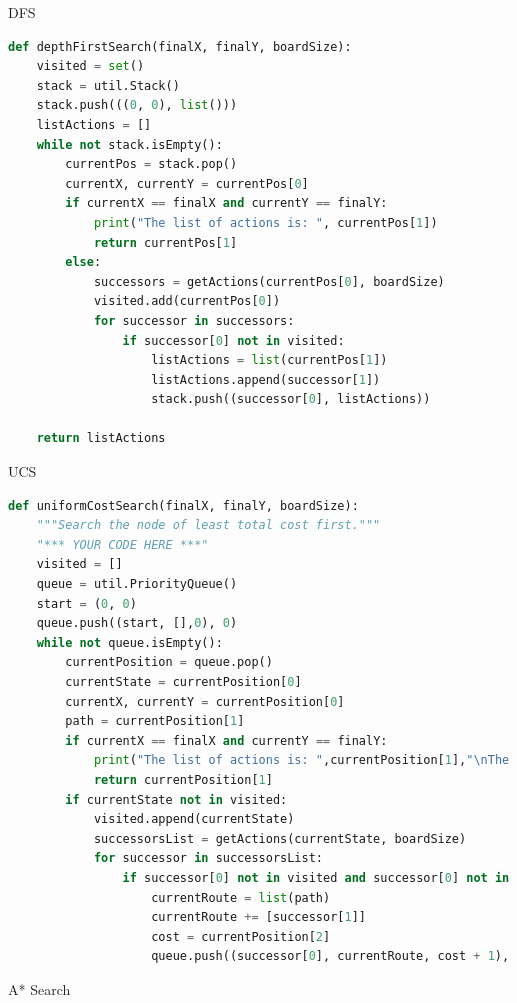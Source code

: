 \documentclass[a4paper,12pt]{report}
\begin{document}
   DFS\\
\begin{lstlisting}[language=Python]
def depthFirstSearch(finalX, finalY, boardSize):
    visited = set()
    stack = util.Stack()
    stack.push(((0, 0), list()))
    listActions = []
    while not stack.isEmpty():
        currentPos = stack.pop()
        currentX, currentY = currentPos[0]
        if currentX == finalX and currentY == finalY:
            print("The list of actions is: ", currentPos[1])
            return currentPos[1]
        else:
            successors = getActions(currentPos[0], boardSize)
            visited.add(currentPos[0])
            for successor in successors:
                if successor[0] not in visited:
                    listActions = list(currentPos[1])
                    listActions.append(successor[1])
                    stack.push((successor[0], listActions))

    return listActions

\end{lstlisting} 
UCS\\
\begin{lstlisting}[language=Python]
def uniformCostSearch(finalX, finalY, boardSize):
    """Search the node of least total cost first."""
    "*** YOUR CODE HERE ***"
    visited = []
    queue = util.PriorityQueue()
    start = (0, 0)
    queue.push((start, [],0), 0)
    while not queue.isEmpty():
        currentPosition = queue.pop()
        currentState = currentPosition[0]
        currentX, currentY = currentPosition[0]
        path = currentPosition[1]
        if currentX == finalX and currentY == finalY:
            print("The list of actions is: ",currentPosition[1],"\nThe cost is",currentPosition[2])
            return currentPosition[1]
        if currentState not in visited:
            visited.append(currentState)
            successorsList = getActions(currentState, boardSize)
            for successor in successorsList:
                if successor[0] not in visited and successor[0] not in [nod[0] for nod in queue.heap]:
                    currentRoute = list(path)
                    currentRoute += [successor[1]]
                    cost = currentPosition[2]
                    queue.push((successor[0], currentRoute, cost + 1), cost + 1)


\end{lstlisting} 
A* Search\\
   
\end{document}
